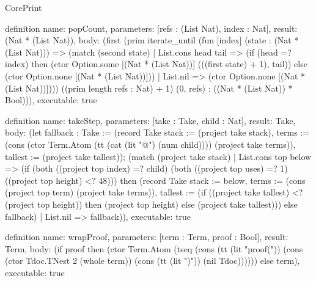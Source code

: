 \begin{lexlean}{CorePrint}
\begin{semanticmodule}
definition{
  name: popCount,
  parameters: [refs : (List Nat), index : Nat],
  result: (Nat * (List Nat)),
  body: (first (prim iterate_until (fun [index] (state : (Nat * (List Nat))) => (match (second state)
    | List.cons head tail => (if (head =? index) then (ctor Option.some [(Nat * (List Nat))] (((first state) + 1), tail)) else (ctor Option.none [(Nat * (List Nat))]))
    | List.nil => (ctor Option.none [(Nat * (List Nat))]))) ((prim length refs : Nat) + 1) (0, refs) : ((Nat * (List Nat)) * Bool))),
  executable: true
}

definition{
  name: takeStep,
  parameters: [take : Take, child : Nat],
  result: Take,
  body: (let fallback : Take := (record Take {stack := (project take stack), terms := (cons (ctor Term.Atom (tt (cat (lit "@") (num child)))) (project take terms)), tallest := (project take tallest)}); (match (project take stack)
    | List.cons top below => (if (both ((project top index) =? child) (both ((project top uses) =? 1) ((project top height) <? 48))) then (record Take {stack := below, terms := (cons (project top term) (project take terms)), tallest := (if ((project take tallest) <? (project top height)) then (project top height) else (project take tallest))}) else fallback)
    | List.nil => fallback)),
  executable: true
}

definition{
  name: wrapProof,
  parameters: [term : Term, proof : Bool],
  result: Term,
  body: (if proof then (ctor Term.Atom (tseq (cons (tt (lit "proof(")) (cons (ctor Tdoc.TNest 2 (whole term)) (cons (tt (lit ")")) (nil Tdoc)))))) else term),
  executable: true
}


\end{semanticmodule}
\end{lexlean}
